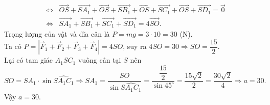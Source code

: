 \begin{bt}
{\begin{eqnarray*}
&\Leftrightarrow &\overrightarrow{OS}+\overrightarrow{SA_1} +\overrightarrow{OS}+\overrightarrow{SB_1} +\overrightarrow{OS}+\overrightarrow{SC_1} +\overrightarrow{OS}+\overrightarrow{SD_1}=\overrightarrow{0}\\
&\Leftrightarrow& \overrightarrow{SA_1}+\overrightarrow{SB_1}+\overrightarrow{SC_1}+\overrightarrow{SD_1}=4\overrightarrow{SO}.
\end{eqnarray*}
Trọng lượng của vật và đĩa cân là $P=mg=3\cdot 10=30$ (N).\\
Ta có $P=\left|\overrightarrow{F}_1 + \overrightarrow{F}_2 + \overrightarrow{F}_3 + \overrightarrow{F}_4\right| = 4SO$, suy ra $4SO=30 \Rightarrow SO=\dfrac{15}{2}$.\\
Lại có tam giác $A_1SC_1$ vuông cân tại $S$ nên
\[SO=SA_1\cdot\sin\widehat{SA_1C_1}\Rightarrow SA_1=\dfrac{SO}{\sin\widehat{SA_1C_1}}=\dfrac{\dfrac{15}{2}}{\sin 45^\circ}=\dfrac{15\sqrt{2}}{2}=\dfrac{30\sqrt{2}}{4}\Rightarrow a=30.\]
Vậy $a=30$.}
\end{bt}


